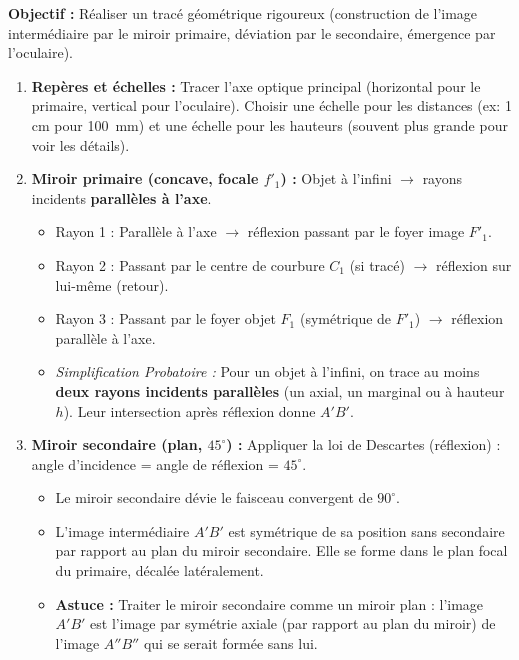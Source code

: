 \documentclass[11pt]{article}
\begin{document}
\begin{methode}
\textbf{Objectif :} Réaliser un tracé géométrique rigoureux (construction de l'image intermédiaire par le miroir primaire, déviation par le secondaire, émergence par l'oculaire).
\begin{enumerate}
    \item \textbf{Repères et échelles :} Tracer l'axe optique principal (horizontal pour le primaire, vertical pour l'oculaire). Choisir une échelle pour les distances (ex: 1 cm pour \SI{100}{mm}) et une échelle pour les hauteurs (souvent plus grande pour voir les détails).
    \item \textbf{Miroir primaire (concave, focale $f'_1$) :} Objet à l'infini $\rightarrow$ rayons incidents \textbf{parallèles à l'axe}.
    \begin{itemize}
        \item Rayon 1 : Parallèle à l'axe $\rightarrow$ réflexion passant par le foyer image $F'_1$.
        \item Rayon 2 : Passant par le centre de courbure $C_1$ (si tracé) $\rightarrow$ réflexion sur lui-même (retour).
        \item Rayon 3 : Passant par le foyer objet $F_1$ (symétrique de $F'_1$) $\rightarrow$ réflexion parallèle à l'axe.
        \item \emph{Simplification Probatoire :} Pour un objet à l'infini, on trace au moins \textbf{deux rayons incidents parallèles} (un axial, un marginal ou à hauteur $h$). Leur intersection après réflexion donne $A'B'$.
    \end{itemize}
    \item \textbf{Miroir secondaire (plan, $45^\circ$) :} Appliquer la loi de Descartes (réflexion) : angle d'incidence = angle de réflexion = $45^\circ$.
    \begin{itemize}
        \item Le miroir secondaire dévie le faisceau convergent de $90^\circ$.
        \item L'image intermédiaire $A'B'$ est symétrique de sa position \og sans secondaire \fg par rapport au plan du miroir secondaire. Elle se forme dans le plan focal du primaire, décalée latéralement.
        \item \textbf{Astuce :} Traiter le miroir secondaire comme un miroir plan : l'image $A'B'$ est l'image par symétrie axiale (par rapport au plan du miroir) de l'image $A''B''$ qui se serait formée sans lui.
    \end{itemize}

\end{enumerate}
\end{methode}
\end{document}
